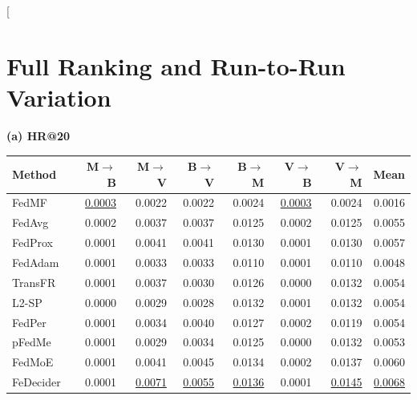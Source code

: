 \clearpage
\twocolumn[{\section{Full Ranking and Run-to-Run Variation}\label{app:full}

\begin{minipage}{\textwidth}
\centering\small
{}
\label{tab:full-directions}
\setlength{\tabcolsep}{3pt}
\renewcommand{\arraystretch}{1.13}
\textbf{(a) HR@20}\par\smallskip
\begin{tabular*}{\linewidth}{@{\extracolsep{\fill}}lrrrrrrr@{}}
\toprule
\textbf{Method} & \textbf{M$\to$B} & \textbf{M$\to$V} & \textbf{B$\to$V} & \textbf{B$\to$M} & \textbf{V$\to$B} & \textbf{V$\to$M} & \textbf{Mean} \\
\midrule
FedMF~\citep{ammad2019federated} & \underline{0.0003} & 0.0022 & 0.0022 & 0.0024 & \underline{0.0003} & 0.0024 & 0.0016 \\
FedAvg~\citep{mcmahan2017communication} & 0.0002 & 0.0037 & 0.0037 & 0.0125 & 0.0002 & 0.0125 & 0.0055 \\
FedProx~\citep{li2020federated} & 0.0001 & 0.0041 & 0.0041 & 0.0130 & 0.0001 & 0.0130 & 0.0057 \\
FedAdam~\citep{reddi2021adaptive} & 0.0001 & 0.0033 & 0.0033 & 0.0110 & 0.0001 & 0.0110 & 0.0048 \\
TransFR~\citep{zhang2026transfr} & 0.0001 & 0.0037 & 0.0030 & 0.0126 & 0.0000 & 0.0132 & 0.0054 \\
L2-SP~\citep{li2018explicit} & 0.0000 & 0.0029 & 0.0028 & 0.0132 & 0.0001 & 0.0132 & 0.0054 \\
FedPer~\citep{arivazhagan2019federated} & 0.0001 & 0.0034 & 0.0040 & 0.0127 & 0.0002 & 0.0119 & 0.0054 \\
pFedMe~\citep{dinh2020personalized} & 0.0001 & 0.0029 & 0.0034 & 0.0125 & 0.0000 & 0.0132 & 0.0053 \\
FedMoE~\citep{mei2024fedmoe} & 0.0001 & 0.0041 & 0.0045 & 0.0134 & 0.0002 & 0.0137 & 0.0060 \\
FeDecider~\citep{he2026fedecider} & 0.0001 & \underline{0.0071} & \underline{0.0055} & \underline{0.0136} & 0.0001 & \underline{0.0145} & \underline{0.0068} \\

\end{tabular*}
\end{minipage}}
